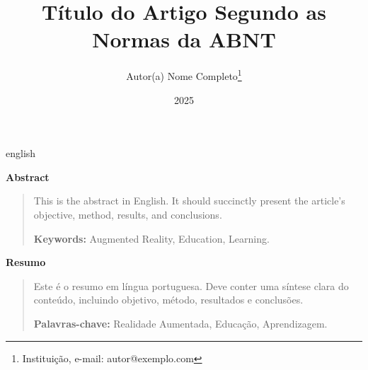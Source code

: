 \documentclass[12pt,oneside]{article}
\title{Título do Artigo Segundo as Normas da ABNT}
\author{Autor(a) Nome Completo\thanks{Instituição, e-mail: autor@exemplo.com}}
\date{2025}
\newenvironment{resumoEng}{%
  \par\vspace{1em}%
  \begin{center}\bfseries Abstract\end{center}%
  \begin{quotation}%
}{\end{quotation}}
\newenvironment{resumoPort}{%
  \par\vspace{1em}%
  \begin{center}\bfseries Resumo\end{center}%
  \begin{quotation}%
}{\end{quotation}}
\begin{document}
\maketitle

\begin{otherlanguage*}{english}
\begin{resumoEng}
This is the abstract in English. It should succinctly present the article’s
objective, method, results, and conclusions.

\textbf{Keywords:} Augmented Reality, Education, Learning.
\end{resumoEng}
\end{otherlanguage*}

\begin{resumoPort}
Este é o resumo em língua portuguesa. Deve conter uma síntese clara do conteúdo,
incluindo objetivo, método, resultados e conclusões.

\textbf{Palavras-chave:} Realidade Aumentada, Educação, Aprendizagem.
\end{resumoPort}













\printbibliography

\appendix
\renewcommand{\thesection}{Apêndice \Alph{section}}
\end{document}
